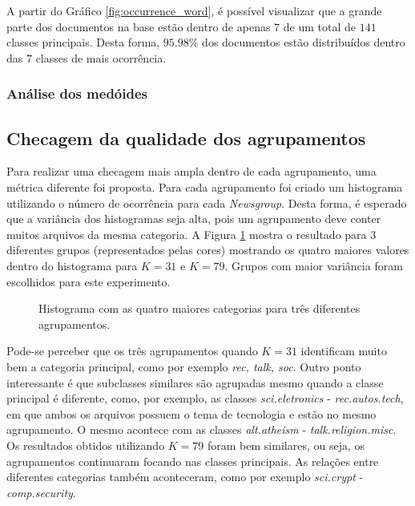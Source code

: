 \documentclass[conference]{IEEEtran}
\begin{document}
A partir do Gráfico \ref{fig:occurrence_word}, é possível visualizar que a grande parte dos documentos na base estão dentro de apenas $7$ de um total de $141$ classes principais. Desta forma, $95.98\%$ dos documentos estão distribuídos dentro das $7$ classes de mais ocorrência.

\subsubsection{Análise dos medóides}




\subsection{Checagem da qualidade dos agrupamentos}

Para realizar uma checagem mais ampla dentro de cada agrupamento, uma métrica diferente foi proposta. Para cada agrupamento foi criado um histograma utilizando o número de ocorrência para cada \emph{Newsgroup}. Desta forma, é esperado que a variância dos histogramas seja alta, pois um agrupamento deve conter muitos arquivos da mesma categoria. A Figura \ref{fig:clusters} mostra o resultado para $3$ diferentes grupos (representados pelas cores) mostrando os quatro maiores valores dentro do histograma para $K = 31$ e $K = 79$. Grupos com maior variância foram escolhidos para este experimento.

\begin{figure}[!h]
	\centering
	{
	}
	\caption{\small Histograma com as quatro maiores categorias para três diferentes agrupamentos.}
	\label{fig:clusters}
\end{figure}

Pode-se perceber que os três agrupamentos quando $K = 31$ identificam muito bem a categoria principal, como por exemplo \emph{rec, talk, soc}. Outro ponto interessante é que subclasses similares são agrupadas mesmo quando a classe principal é diferente, como, por exemplo, as classes \emph{sci.eletronics} - \emph{rec.autos.tech}, em que ambos os arquivos possuem o tema de tecnologia e estão no mesmo agrupamento. O mesmo acontece com as classes \emph{alt.atheism} - \emph{talk.religion.misc}. Os resultados obtidos utilizando $K = 79$ foram bem similares, ou seja, os agrupamentos continuaram focando nas classes principais. As relações entre diferentes categorias também aconteceram, como por exemplo \emph{sci.crypt} - \emph{comp.security}.
\end{document}
